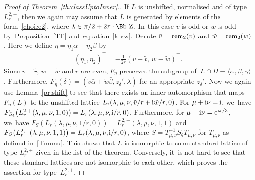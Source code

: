 \documentclass[10pt,a4paper]{amsart}
\newcommand\ZZ{{\mbox{\Bb Z}}}
\newcommand{\rem}{\mathop{{\rm rem}}}
\newcommand\la{\langle}
\newcommand\ra{\rangle}
\numberwithin{equation}{section}
\begin{document}
\begin{proof}[Proof of Theorem~\ref{th:classUptoInner}.]
If $L$ is unshifted, normalised and of type $L^{2,+}_r$, then we again may assume that $L$ is generated by elements of the form~\eqref{choice2}, where $\lambda\in\pi/2+2\pi\cdot\ZZ$. In~this case $v$ is odd or $w$ is odd by~Proposition~\ref{TF} and~equation~\eqref{klvw}. Denote $\tilde v=\rem_2(v)$ and $\tilde w=\rem_2(w)$.
Here we define $\eta=\eta_1\bar \alpha +\eta_2\bar\beta$ by
\begin{gather*}
(\eta_1,\eta_2)^\top=-\frac{1}{2r}(v-\tilde v,\,w-\tilde w)^\top.
\end{gather*}
Since $v-\tilde v$, $w-\tilde w$ and $r$ are even, $F_{\eta}$ preserves the subgroup of~$L\cap H=\la \alpha,\beta,\gamma\ra$. Furthermore, $F_{\eta}(\delta)=(\tilde v\bar\alpha+\tilde w\bar\beta,z_\delta',\lambda)$ for an appropriate $z_\delta'$.
Now we again use Lemma~\ref{pr:shift} to see that there exists an inner automorphism that maps $F_\eta(L)$ to the unshifted lattice $L_r(\lambda,\mu,\nu,\tilde v/r+{\rm i}\tilde w/r,0)$.
For $\mu+{\rm i}\nu={\rm i}$, we~have $F_{S_4}\big(L^{2,+}_r(\lambda,\mu,\nu,1,0)\big)=L_r(\lambda,\mu,\nu,{\rm i}/r,0)$. Furthermore, for $\mu+{\rm i}\nu={\rm e}^{{\rm i}\pi/3}$, we~have $F_{S}(L_r(\lambda,\mu,\nu,1/r,0))=L^{2,+}_r(\lambda,\mu,\nu,1,1)$ and $F_{S}\big(L^{2,+}_r(\lambda,\mu,\nu,1,1)\big)=L_r(\lambda,\mu,\nu,{\rm i}/r,0)$, where $S=T_{\mu,\nu}^{-1}S_6T_{\mu,\nu}$ for $T_{\mu,\nu}$ as defined in~\eqref{Tmunu}.
This shows that $L$ is isomorphic to some standard lattice of type $L^{2,+}_r$ given in the list of the theorem. Conversely, it~is not hard to see that these standard lattices are not isomorphic to each other, which proves the assertion for type~$L^{2,+}_r$.


\end{proof}
\end{document}
